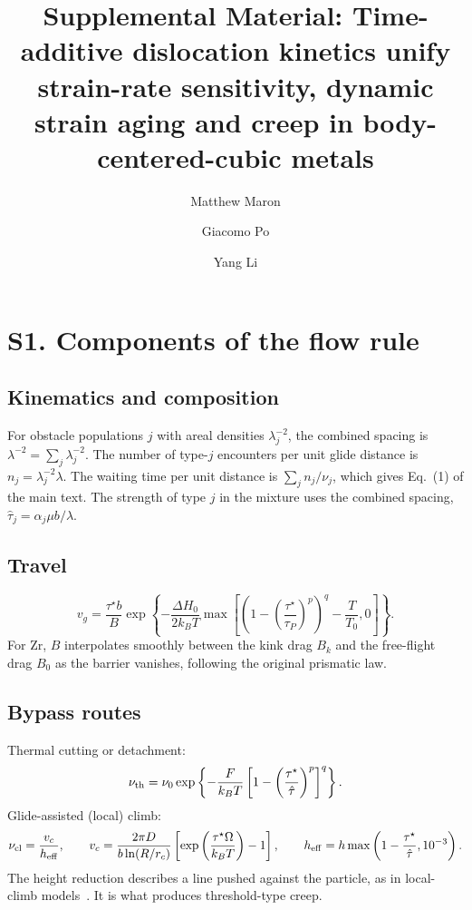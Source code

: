 \documentclass[aps,prl,onecolumn,superscriptaddress,amsmath,amssymb,floatfix]{revtex4-2}
\newcommand{\ts}{\tau^{\star}}
\newcommand{\kT}{k_BT}
\begin{document}
\title{Supplemental Material: Time-additive dislocation kinetics unify strain-rate sensitivity, dynamic strain aging and creep in body-centered-cubic metals}
\author{Matthew Maron}
\author{Giacomo Po}
\author{Yang Li}
\maketitle

\section{S1. Components of the flow rule}

\subsection{Kinematics and composition}
For obstacle populations $j$ with areal densities $\lambda_j^{-2}$, the combined spacing is $\lambda^{-2}=\sum_j\lambda_j^{-2}$. The number of type-$j$ encounters per unit glide distance is $n_j=\lambda_j^{-2}\lambda$. The waiting time per unit distance is $\sum_jn_j/\nu_j$, which gives Eq.~(1) of the main text. The strength of type $j$ in the mixture uses the combined spacing, $\hat\tau_j=\alpha_j\mu b/\lambda$.

\subsection{Travel}
\begin{equation}
v_g=\frac{\ts b}{B}\exp\left\{-\frac{\Delta H_0}{2\kT}\max\left[\left(1-\left(\frac{\ts}{\tau_P}\right)^p\right)^q-\frac{T}{T_0},0\right]\right\}.
\end{equation}
For Zr, $B$ interpolates smoothly between the kink drag $B_k$ and the free-flight drag $B_0$ as the barrier vanishes, following the original prismatic law.

\subsection{Bypass routes}
Thermal cutting or detachment:
\begin{equation}
\nu_{\rm th}=\nu_0\exp\left\{-\frac{F}{\kT}\left[1-\left(\frac{\ts}{\hat\tau}\right)^p\right]^q\right\}.
\end{equation}
Glide-assisted (local) climb:
\begin{equation}
\nu_{\rm cl}=\frac{v_c}{h_{\rm eff}},\qquad
v_c=\frac{2\pi D}{b\ln(R/r_c)}\left[\exp\left(\frac{\ts\Omega}{\kT}\right)-1\right],\qquad
h_{\rm eff}=h\max\left(1-\frac{\ts}{\hat\tau},10^{-3}\right).
\end{equation}
The height reduction describes a line pushed against the particle, as in local-climb models~\cite{S_BrownHam}. It is what produces threshold-type creep.
\end{document}
